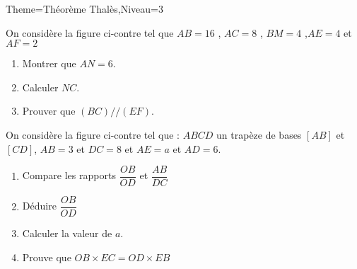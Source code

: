 \documentclass[a4paper,12pt]{article}
\begin{document}
\begin{Maquette}[Fiche]{Theme=Théorème Thalès,Niveau=3}
\begin{exercice}
\begin{minipage}{.6\linewidth}
On considère la figure ci-contre tel que $AB=16$ , $AC=8$ , $BM=4$ ,$AE=4$ et $AF=2$
\begin{enumerate}
\item Montrer que $AN=6$.
\item Calculer $NC$.
\item Prouver que $(BC)//(EF)$.
\end{enumerate}
\end{minipage}%
\begin{minipage}{.4\linewidth}
\end{minipage}
\end{exercice}

\begin{exercice}
\begin{minipage}{.65\linewidth}
On considère la figure ci-contre tel que : $ABCD$ un trapèze de bases $[AB]$ et $[CD]$, $AB=3$ et $DC=8$ et $AE=a$ et $AD=6$.
\begin{enumerate}
\item Compare les rapports $\dfrac{OB}{OD}$ et $\dfrac{AB}{DC}$
\item Déduire $\dfrac{OB}{OD}$
\item Calculer la valeur de $a$.
\item Prouve que $OB\times EC=OD\times EB$
\end{enumerate}
\end{minipage}%
\begin{minipage}{.35\linewidth}
\end{minipage}
\end{exercice}


\end{Maquette}
\end{document}
